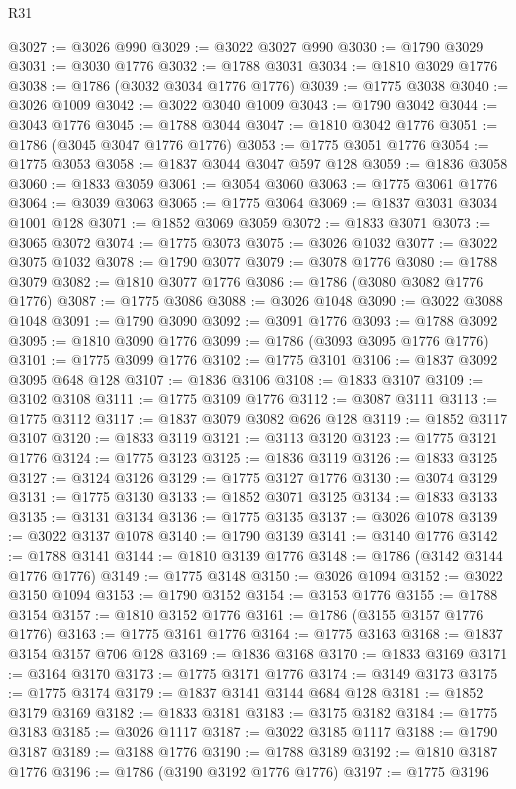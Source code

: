 \begin{lexlean}{R31}
\begin{coremodule}
@3027 := @3026 @990
@3029 := @3022 @3027 @990
@3030 := @1790 @3029
@3031 := @3030 @1776
@3032 := @1788 @3031
@3034 := @1810 @3029 @1776
@3038 := @1786 (@3032 @3034 @1776 @1776)
@3039 := @1775 @3038
@3040 := @3026 @1009
@3042 := @3022 @3040 @1009
@3043 := @1790 @3042
@3044 := @3043 @1776
@3045 := @1788 @3044
@3047 := @1810 @3042 @1776
@3051 := @1786 (@3045 @3047 @1776 @1776)
@3053 := @1775 @3051 @1776
@3054 := @1775 @3053
@3058 := @1837 @3044 @3047 @597 @128
@3059 := @1836 @3058
@3060 := @1833 @3059
@3061 := @3054 @3060
@3063 := @1775 @3061 @1776
@3064 := @3039 @3063
@3065 := @1775 @3064
@3069 := @1837 @3031 @3034 @1001 @128
@3071 := @1852 @3069 @3059
@3072 := @1833 @3071
@3073 := @3065 @3072
@3074 := @1775 @3073
@3075 := @3026 @1032
@3077 := @3022 @3075 @1032
@3078 := @1790 @3077
@3079 := @3078 @1776
@3080 := @1788 @3079
@3082 := @1810 @3077 @1776
@3086 := @1786 (@3080 @3082 @1776 @1776)
@3087 := @1775 @3086
@3088 := @3026 @1048
@3090 := @3022 @3088 @1048
@3091 := @1790 @3090
@3092 := @3091 @1776
@3093 := @1788 @3092
@3095 := @1810 @3090 @1776
@3099 := @1786 (@3093 @3095 @1776 @1776)
@3101 := @1775 @3099 @1776
@3102 := @1775 @3101
@3106 := @1837 @3092 @3095 @648 @128
@3107 := @1836 @3106
@3108 := @1833 @3107
@3109 := @3102 @3108
@3111 := @1775 @3109 @1776
@3112 := @3087 @3111
@3113 := @1775 @3112
@3117 := @1837 @3079 @3082 @626 @128
@3119 := @1852 @3117 @3107
@3120 := @1833 @3119
@3121 := @3113 @3120
@3123 := @1775 @3121 @1776
@3124 := @1775 @3123
@3125 := @1836 @3119
@3126 := @1833 @3125
@3127 := @3124 @3126
@3129 := @1775 @3127 @1776
@3130 := @3074 @3129
@3131 := @1775 @3130
@3133 := @1852 @3071 @3125
@3134 := @1833 @3133
@3135 := @3131 @3134
@3136 := @1775 @3135
@3137 := @3026 @1078
@3139 := @3022 @3137 @1078
@3140 := @1790 @3139
@3141 := @3140 @1776
@3142 := @1788 @3141
@3144 := @1810 @3139 @1776
@3148 := @1786 (@3142 @3144 @1776 @1776)
@3149 := @1775 @3148
@3150 := @3026 @1094
@3152 := @3022 @3150 @1094
@3153 := @1790 @3152
@3154 := @3153 @1776
@3155 := @1788 @3154
@3157 := @1810 @3152 @1776
@3161 := @1786 (@3155 @3157 @1776 @1776)
@3163 := @1775 @3161 @1776
@3164 := @1775 @3163
@3168 := @1837 @3154 @3157 @706 @128
@3169 := @1836 @3168
@3170 := @1833 @3169
@3171 := @3164 @3170
@3173 := @1775 @3171 @1776
@3174 := @3149 @3173
@3175 := @1775 @3174
@3179 := @1837 @3141 @3144 @684 @128
@3181 := @1852 @3179 @3169
@3182 := @1833 @3181
@3183 := @3175 @3182
@3184 := @1775 @3183
@3185 := @3026 @1117
@3187 := @3022 @3185 @1117
@3188 := @1790 @3187
@3189 := @3188 @1776
@3190 := @1788 @3189
@3192 := @1810 @3187 @1776
@3196 := @1786 (@3190 @3192 @1776 @1776)
@3197 := @1775 @3196

\end{coremodule}
\end{lexlean}
